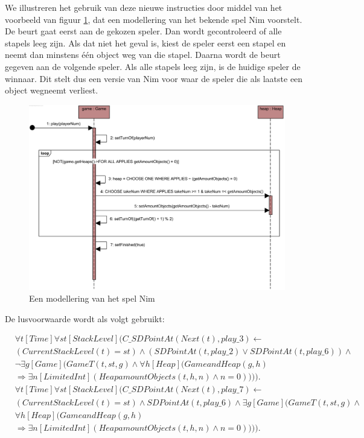 We illustreren het gebruik van deze nieuwe instructies door middel van het voorbeeld van figuur \ref{fig:new-nim}, dat een modellering van het bekende spel Nim voorstelt. De beurt gaat eerst aan de gekozen speler. Dan wordt gecontroleerd of alle stapels leeg zijn. Als dat niet het geval is, kiest de speler eerst een stapel en neemt dan minstens \'e\'en object weg van die stapel. Daarna wordt de beurt gegeven aan de volgende speler. Als alle stapels leeg zijn, is de huidige speler de winnaar. Dit stelt dus een versie van Nim voor waar de speler die als laatste een object wegneemt verliest.

\begin{figure}[H]
	\includegraphics[width=\textwidth]{chap-gedrag/seq-new-nim.png}
	\caption{Een modellering van het spel Nim}
	\label{fig:new-nim}
\end{figure}

De lusvoorwaarde wordt als volgt gebruikt:

\begin{align}
	\nonumber &\forall{t}[Time]\forall{st}[StackLevel](C\_SDPointAt(Next(t), play\_3) \leftarrow \\ \nonumber &(CurrentStackLevel(t) = st) \land (SDPointAt(t, play\_2) \lor SDPointAt(t, play\_6)) \land \\ \nonumber &\lnot{}\exists{g}[Game](GameT(t, st, g) \land{}\forall{h}[Heap](GameandHeap(g, h) \\ &\Rightarrow \exists{n}[LimitedInt](HeapamountObjects(t, h, n) \land n = 0)))). \\
	\nonumber &\forall{t}[Time]\forall{st}[StackLevel](C\_SDPointAt(Next(t), play\_7) \leftarrow \\ \nonumber &(CurrentStackLevel(t) = st) \land SDPointAt(t, play\_6) \land \exists{g}[Game](GameT(t, st, g) \land \\ \nonumber &\forall{h}[Heap](GameandHeap(g, h) \\ &\Rightarrow \exists{n}[LimitedInt](HeapamountObjects(t, h, n) \land n = 0)))).
\end{align}

